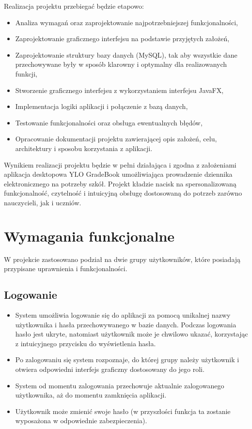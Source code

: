 Realizacja projektu przebiegać będzie etapowo:
\begin{itemize}
      \item Analiza wymagań oraz zaprojektowanie najpotrzebniejszej funkcjonalności,
      \item Zaprojektowanie graficznego interfejsu na podstawie przyjętych założeń,
      \item Zaprojektowanie struktury bazy danych (MySQL), tak aby wszystkie dane przechowywane były w sposób klarowny i optymalny dla realizowanych funkcji,
      \item Stworzenie graficznego interfejsu z wykorzystaniem interfejsu JavaFX,
      \item Implementacja logiki aplikacji i połączenie z bazą danych,
      \item Testowanie funkcjonalności oraz obsługa ewentualnych błędów,
      \item Opracowanie dokumentacji projektu zawierającej opis założeń, celu, architektury i sposobu korzystania z aplikacji.
\end{itemize}
Wynikiem realizacji projektu będzie w pełni działająca i zgodna z założeniami aplikacja desktopowa YLO GradeBook umożliwiająca prowadzenie dziennika elektronicznego na potrzeby szkół. Projekt kładzie nacisk na spersonalizowaną funkcjonalność, czytelność i intuicyjną obsługę dostosowaną do potrzeb zarówno nauczycieli, jak i uczniów.

\section{Wymagania funkcjonalne}
\label{sec:WymaganiaFunkcjonalne}
W projekcie zastosowano podział na dwie grupy użytkowników, które posiadają przypisane uprawnienia i funkcjonalności.

\subsection{Logowanie}
\label{sec:Logowanie}
\begin{itemize}
      \item System umożliwia logowanie się do aplikacji za pomocą unikalnej nazwy użytkownika i hasła przechowywanego w bazie danych. Podczas logowania hasło jest ukryte, natomiast użytkownik może je chwilowo ukazać, korzystając z intuicyjnego przycisku do wyświetlenia hasła.
      \item Po zalogowaniu się system rozpoznaje, do której grupy należy użytkownik i otwiera odpowiedni interfejs graficzny dostosowany do jego roli.
      \item System od momentu zalogowania przechowuje aktualnie zalogowanego użytkownika, aż do momentu zamknięcia aplikacji.
      \item Użytkownik może zmienić swoje hasło (w przyszłości funkcja ta zostanie wyposażona w odpowiednie zabezpieczenia).
\end{itemize}


